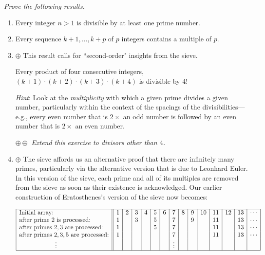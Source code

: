 \begin{enumerate}
\begin{enumerate}
\smallskip

{\em Prove the following results.}
     \begin{enumerate}
     \item
\begin{prop}
Every integer $n>1$ is divisible by at least one prime number.
\end{prop}

     \medskip\item
\begin{prop}
Every sequence $k+1, \ldots, k+p$ of $p$ integers contains a multiple of $p$.
\end{prop}

      \medskip\item $\oplus$ This result calls for ``second-order" insights from the sieve.
\begin{prop}
Every product of four consecutive integers, $(k+1) \cdot (k+2) \cdot (k+3) \cdot (k+4)$ is divisible by $4!$
\end{prop}

\smallskip

{\em Hint}:  Look at the {\em multiplicity} with which a given prime divides a given number, particularly within the context of the spacings of the divisibilities---e.g., every even number that is $2 \times$ an odd number is followed by an even number that is $2 \times$ an even number.  

\smallskip

$\oplus \oplus$ {\em Extend this exercise to divisors other than $4$.}

\medskip\item
$\oplus$
The sieve affords us an alternative proof that there are infinitely many primes, particularly via the alternative version that is due to Leonhard Euler.  In this version of the sieve, each prime and all of its multiples are removed from the sieve as soon as their existence is acknowledged.  Our earlier construction of Eratosthenes's version of the sieve now becomes:


\medskip

$\begin{array}{|l||c|c|c|c|c|c|c|c|c|c|c|c|c|c|}
\hline
\mbox{Initial array:} &
1 & 2 & 3 & 4 & 5 & 6 & 7 & 8 & 9 & 10 & 11 & 12 & 13 & \cdots \\
\mbox{after prime $2$ is processed:} &
1 &  & 3 &  & 5 &  & 7 &  & 9 &  & 11 &  & 13 & \cdots \\
\mbox{after primes $2, 3$ are processed:} &
1 &  &  &  & 5 &  & 7 &  &  &  & 11 &  & 13 & \cdots \\
\mbox{after primes $2, 3, 5$ are processed:} &
1 &  &  &  &  &  & 7 &  &  &  & 11 &  & 13 & \cdots \\
\hspace*{.8in} \vdots  &
 &  &  &  &  &  & \vdots &  &  &  &  &  &  & \\
\hline
\end{array}$



\end{enumerate}
\end{enumerate}
\end{enumerate}
